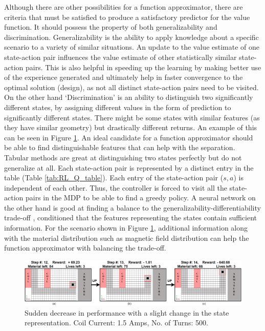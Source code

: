 Although there are other possibilities for a function approximator, there are criteria that must be satisfied to produce a satisfactory predictor for the value function. It should possess the property of both generalizability and discrimination. Generalizability is the ability to apply knowledge about a specific scenario to a variety of similar situations. An update to the value estimate of one state-action pair influences the value estimate of other statistically similar state-action pairs. This is also helpful in speeding up the learning by making better use of the experience generated and ultimately help in faster convergence to the optimal solution (design), as not all distinct state-action pairs need to be visited. 
On the other hand `Discrimination' is an ability to distinguish two significantly different states, by assigning different values in the form of prediction to significantly different states. There might be some states with similar features (as they have similar geometry) but drastically different returns. An example of this can be seen in Figure \ref{fig:RL_c_core_negative_error}. An ideal candidate for a function approximator should be able to find distinguishable features that can help with the separation. Tabular methods are great at distinguishing two states perfectly but do not generalize at all. Each state-action pair is represented by a distinct entry in the table (Table \ref{tab:RL_Q_table}). Each entry of the state-action pair ($s, a$) is independent of each other. Thus, the controller is forced to visit all the state-action pairs in the MDP to be able to find a greedy policy. A neural network on the other hand is good at finding a balance to the generalizability-differentiability trade-off \parencite{hornik1989multilayer}, conditioned that the features representing the states contain sufficient information. For the scenario shown in Figure \ref{fig:RL_c_core_negative_error}, additional information along with the material distribution such as magnetic field distribution can help the function approximator with balancing the trade-off.

\begin{figure}[h!]
    \centering
    \includegraphics[width=\textwidth]{Figures/Ch_RL/c_core_negative_error2.png}
    \caption{Sudden decrease in performance with a slight change in the state representation. Coil Current: 1.5 Amps, No. of Turns: 500.}
    \label{fig:RL_c_core_negative_error}
\end{figure}


